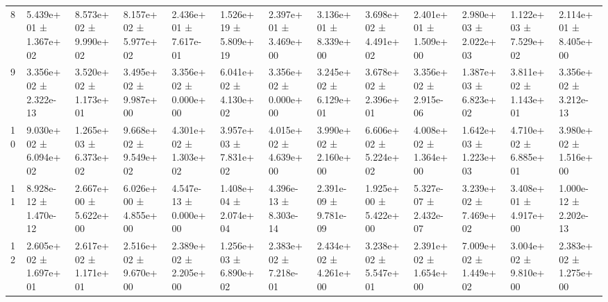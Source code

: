 \begin{table}
\begin{tabular}{lllllllllllll}
8 & 5.439e+01 ± 1.367e+02 & 8.573e+02 ± 9.990e+02 & 8.157e+02 ± 5.977e+02 & 2.436e+01 ± 7.617e-01 & 1.526e+19 ± 5.809e+19 & 2.397e+01 ± 3.469e+00 & 3.136e+01 ± 8.339e+00 & 3.698e+02 ± 4.491e+02 & 2.401e+01 ± 1.509e+00 & 2.980e+03 ± 2.022e+03 & 1.122e+03 ± 7.529e+02 & 2.114e+01 ± 8.405e+00 \\
9 & 3.356e+02 ± 2.322e-13 & 3.520e+02 ± 1.173e+01 & 3.495e+02 ± 9.987e+00 & 3.356e+02 ± 0.000e+00 & 6.041e+02 ± 4.130e+02 & 3.356e+02 ± 0.000e+00 & 3.245e+02 ± 6.129e+01 & 3.678e+02 ± 2.396e+01 & 3.356e+02 ± 2.915e-06 & 1.387e+03 ± 6.823e+02 & 3.811e+02 ± 1.143e+01 & 3.356e+02 ± 3.212e-13 \\
10 & 9.030e+02 ± 6.094e+02 & 1.265e+03 ± 6.373e+02 & 9.668e+02 ± 9.549e+02 & 4.301e+02 ± 1.303e+02 & 3.957e+03 ± 7.831e+02 & 4.015e+02 ± 4.639e+00 & 3.990e+02 ± 2.160e+00 & 6.606e+02 ± 5.224e+02 & 4.008e+02 ± 1.364e+00 & 1.642e+03 ± 1.223e+03 & 4.710e+02 ± 6.885e+01 & 3.980e+02 ± 1.516e+00 \\
11 & 8.928e-12 ± 1.470e-12 & 2.667e+00 ± 5.622e+00 & 6.026e+00 ± 4.855e+00 & 4.547e-13 ± 0.000e+00 & 1.408e+04 ± 2.074e+04 & 4.396e-13 ± 8.303e-14 & 2.391e-09 ± 9.781e-09 & 1.925e+00 ± 5.422e+00 & 5.327e-07 ± 2.432e-07 & 3.239e+02 ± 7.469e+02 & 3.408e+01 ± 4.917e+00 & 1.000e-12 ± 2.202e-13 \\
12 & 2.605e+02 ± 1.697e+01 & 2.617e+02 ± 1.171e+01 & 2.516e+02 ± 9.670e+00 & 2.389e+02 ± 2.205e+00 & 1.256e+03 ± 6.890e+02 & 2.383e+02 ± 7.218e-01 & 2.434e+02 ± 4.261e+00 & 3.238e+02 ± 5.547e+01 & 2.391e+02 ± 1.654e+00 & 7.009e+02 ± 1.449e+02 & 3.004e+02 ± 9.810e+00 & 2.383e+02 ± 1.275e+00 \\
\bottomrule
\end{tabular}
\end{table}
